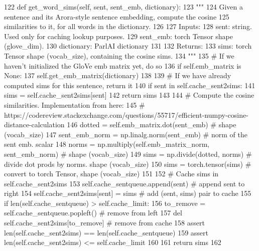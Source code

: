 \begin{DoxyCode}
122     \textcolor{keyword}{def }get\_word\_sims(self, sent, sent\_emb, dictionary):
123         \textcolor{stringliteral}{"""}
124 \textcolor{stringliteral}{        Given a sentence and its Arora-style sentence embedding, compute the cosine}
125 \textcolor{stringliteral}{        similarities to it, for all words in the dictionary.}
126 \textcolor{stringliteral}{}
127 \textcolor{stringliteral}{        Inputs:}
128 \textcolor{stringliteral}{          sent: string. Used only for caching lookup purposes.}
129 \textcolor{stringliteral}{          sent\_emb: torch Tensor shape (glove\_dim).}
130 \textcolor{stringliteral}{          dictionary: ParlAI dictionary}
131 \textcolor{stringliteral}{}
132 \textcolor{stringliteral}{        Returns:}
133 \textcolor{stringliteral}{          sims: torch Tensor shape (vocab\_size), containing the cosine sims.}
134 \textcolor{stringliteral}{        """}
135         \textcolor{comment}{# If we haven't initialized the GloVe emb matrix yet, do so}
136         \textcolor{keywordflow}{if} self.emb\_matrix \textcolor{keywordflow}{is} \textcolor{keywordtype}{None}:
137             self.get\_emb\_matrix(dictionary)
138 
139         \textcolor{comment}{# If we have already computed sims for this sentence, return it}
140         \textcolor{keywordflow}{if} sent \textcolor{keywordflow}{in} self.cache\_sent2sims:
141             sims = self.cache\_sent2sims[sent]
142             \textcolor{keywordflow}{return} sims
143 
144         \textcolor{comment}{# Compute the cosine similarities. Implementation from here:}
145         \textcolor{comment}{#  https://codereview.stackexchange.com/questions/55717/efficient-numpy-cosine-distance-calculation}
146         dotted = self.emb\_matrix.dot(sent\_emb)  \textcolor{comment}{# shape (vocab\_size)}
147         sent\_emb\_norm = np.linalg.norm(sent\_emb)  \textcolor{comment}{# norm of the sent emb. scalar}
148         norms = np.multiply(self.emb\_matrix\_norm, sent\_emb\_norm)  \textcolor{comment}{# shape (vocab\_size)}
149         sims = np.divide(dotted, norms)  \textcolor{comment}{# divide dot prods by norms. shape (vocab\_size)}
150         sims = torch.tensor(sims)  \textcolor{comment}{# convert to torch Tensor, shape (vocab\_size)}
151 
152         \textcolor{comment}{# Cache sims in self.cache\_sent2sims}
153         self.cache\_sentqueue.append(sent)  \textcolor{comment}{# append sent to right}
154         self.cache\_sent2sims[sent] = sims  \textcolor{comment}{# add (sent, sims) pair to cache}
155         \textcolor{keywordflow}{if} len(self.cache\_sentqueue) > self.cache\_limit:
156             to\_remove = self.cache\_sentqueue.popleft()  \textcolor{comment}{# remove from left}
157             del self.cache\_sent2sims[to\_remove]  \textcolor{comment}{# remove from cache}
158         \textcolor{keyword}{assert} len(self.cache\_sent2sims) == len(self.cache\_sentqueue)
159         \textcolor{keyword}{assert} len(self.cache\_sent2sims) <= self.cache\_limit
160 
161         \textcolor{keywordflow}{return} sims
162 
\end{DoxyCode}


